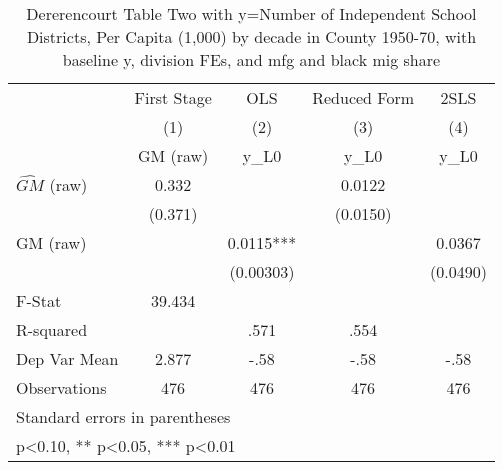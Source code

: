 \begin{table}[htbp]\centering
\def\sym#1{\ifmmode^{#1}\else\(^{#1}\)\fi}
\caption{Dererencourt Table Two with y=Number of Independent School Districts, Per Capita (1,000) by decade in County 1950-70, with baseline y, division FEs, and mfg and black mig share}
\begin{tabular}{l*{4}{c}}
\toprule
                    & First Stage   &         OLS   &Reduced Form   &        2SLS   \\
                    &\multicolumn{1}{c}{(1)}&\multicolumn{1}{c}{(2)}&\multicolumn{1}{c}{(3)}&\multicolumn{1}{c}{(4)}\\
                    &\multicolumn{1}{c}{GM  (raw)}&\multicolumn{1}{c}{y\_L0}&\multicolumn{1}{c}{y\_L0}&\multicolumn{1}{c}{y\_L0}\\
\midrule
$\hat{GM}$ (raw)    &       0.332   &               &      0.0122   &               \\
                    &     (0.371)   &               &    (0.0150)   &               \\
\addlinespace
GM  (raw)           &               &      0.0115***&               &      0.0367   \\
                    &               &   (0.00303)   &               &    (0.0490)   \\
\midrule
F-Stat              &      39.434   &               &               &               \\
R-squared           &               &        .571   &        .554   &               \\
Dep Var Mean        &       2.877   &        -.58   &        -.58   &        -.58   \\
Observations        &         476   &         476   &         476   &         476   \\
\bottomrule
\multicolumn{5}{l}{\footnotesize Standard errors in parentheses}\\
\multicolumn{5}{l}{\footnotesize * p<0.10, ** p<0.05, *** p<0.01}\\
\end{tabular}
\end{table}
